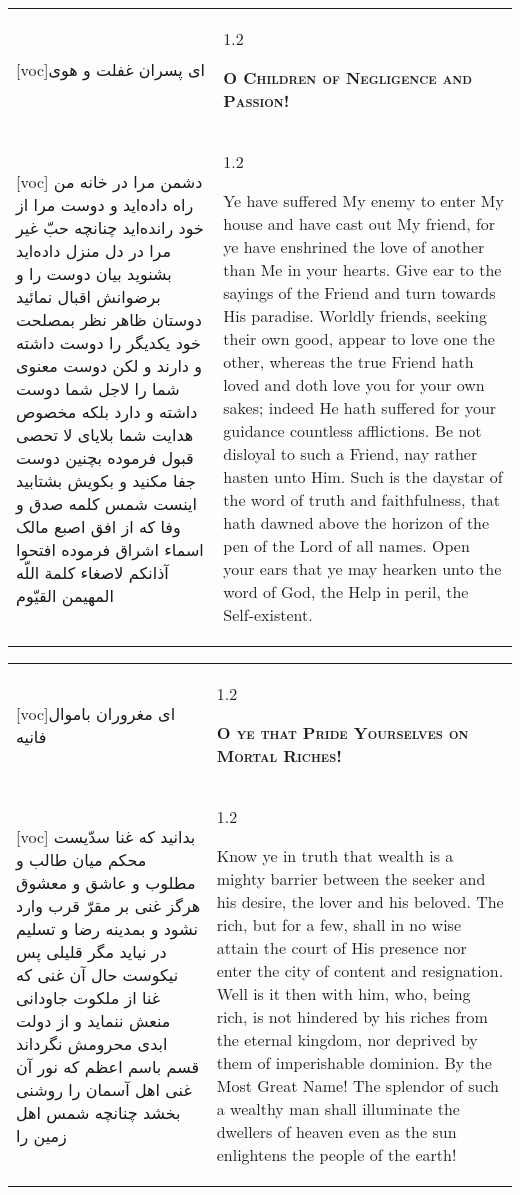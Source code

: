 \documentclass[11pt]{article}
\makeatletter
\newenvironment{orig}
  {\begin{farsi}[voc]}
  {\end{farsi}}
\newenvironment{trans}
  {\Large\begin{spacing}{1.2}\raggedright}
  {\end{spacing}}
\newenvironment{word}
  {\begin{tabular}[t]{p{2.75in}@{\hspace{3em}}p{2.75in}}}
  {\end{tabular}}
\newcommand{\ayat}[2]{\begin{orig}#1\end{orig} & \begin{trans}#2\end{trans}}
\newcommand{\heading}[2]{\textsc{\textbf{#1}} %
}
\makeatother
\begin{document}
\pagebreak

\begin{word}
\ayat{ای پسران غفلت و هوی}{\heading{O Children of Negligence and Passion!}{}} \\ \ayat{
دشمن مرا در خانه من راه داده‌ايد و دوست مرا از خود رانده‌ايد چنانچه حبّ غير مرا در دل منزل داده‌ايد
بشنويد بيان دوست را و برضوانش اقبال نمائيد
دوستان ظاهر نظر بمصلحت خود يکديگر را دوست داشته و دارند و لکن دوست معنوی شما را لاجل شما دوست داشته و دارد بلکه مخصوص هدايت شما بلايای لا تحصی قبول فرموده
بچنين دوست جفا مکنيد و بکويش بشتابيد
اينست شمس کلمه صدق و وفا که از افق اصبع مالک اسماء اشراق فرموده
افتحوا آذانکم لاصغاء کلمة اللّه المهيمن القيّوم
}{
  Ye have suffered My enemy to enter My house and have cast out My friend, for
  ye have enshrined the love of another than Me in your hearts. Give ear to
  the sayings of the Friend and turn towards His paradise. Worldly friends,
  seeking their own good, appear to love one the other, whereas the true
  Friend hath loved and doth love you for your own sakes; indeed He hath
  suffered for your guidance countless afflictions. Be not disloyal to such a
  Friend, nay rather hasten unto Him. Such is the daystar of the word of truth
  and faithfulness, that hath dawned above the horizon of the pen of the Lord
  of all names. Open your ears that ye may hearken unto the word of God, the
  Help in peril, the Self-existent.
}
\end{word}

\pagebreak

\begin{word}
\ayat{ای مغروران باموال فانيه}{\heading{O ye that Pride Yourselves on Mortal Riches!}{}} \\ \ayat{
بدانيد که غنا سدّيست محکم ميان طالب و مطلوب و عاشق و معشوق هرگز غنی بر مقرّ قرب وارد نشود و بمدينه رضا و تسليم در نيايد مگر قليلی
پس نيکوست حال آن غنی که غنا از ملکوت جاودانی منعش ننمايد و از دولت ابدی محرومش نگرداند
قسم باسم اعظم که نور آن غنی اهل آسمان را روشنی بخشد چنانچه شمس اهل زمين را
}{
  Know ye in truth that wealth is a mighty barrier between the seeker and his
  desire, the lover and his beloved. The rich, but for a few, shall in no wise
  attain the court of His presence nor enter the city of content and
  resignation. Well is it then with him, who, being rich, is not hindered by
  his riches from the eternal kingdom, nor deprived by them of imperishable
  dominion. By the Most Great Name! The splendor of such a wealthy man shall
  illuminate the dwellers of heaven even as the sun enlightens the people of
  the earth!
}
\end{word}
\end{document}
